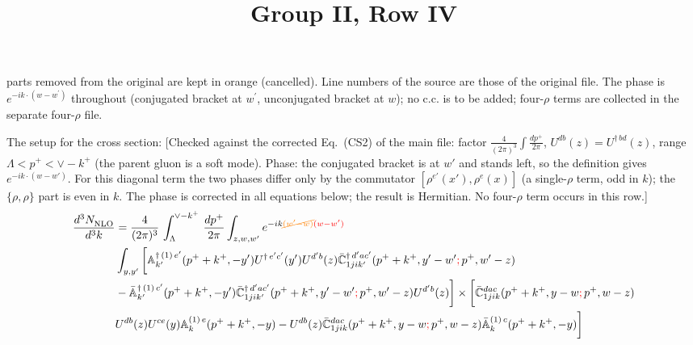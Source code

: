 \documentclass[9pt]{article}
\title{Group II, Row IV}
\author{}
\date{}
\def\mf#1{\mathbb{#1}}
\numberwithin{equation}{section}
\begin{document}
\maketitle {} {\color{orange}parts removed from the original are kept in orange (cancelled).} {\color{red}Line numbers of the source are those of the original file. The phase is $e^{-ik\cdot(w-w^{\prime})}$ throughout (conjugated bracket at $w^{\prime}$, unconjugated bracket at $w$); no c.c. is to be added; four-$\rho$ terms are collected in the separate four-$\rho$ file.}\par
The setup for the cross section: {\color{red}[Checked against the corrected Eq.~(CS2) of the main file: factor $\frac{4}{(2\pi)^{3}}\int\frac{dp^{+}}{2\pi}$, $U^{db}(z)=U^{\dagger\,bd}(z)$, range $\Lambda<p^{+}<\vee-k^{+}$ (the parent gluon is a soft mode). Phase: the conjugated bracket is at $w'$ and stands left, so the definition gives $e^{-ik\cdot(w-w')}$. For this diagonal term the two phases differ only by the commutator $[\rho^{e'}(x'),\rho^{e}(x)]$ (a single-$\rho$ term, odd in $k$); the $\{\rho,\rho\}$ part is even in $k$. The phase is corrected in all equations below; the result is Hermitian. No four-$\rho$ term occurs in this row.]}
\begin{align}
    \frac{d^{3}N_{\rm NLO}^{\rm}}{d^{3}k}  & = \frac{4}{(2\pi)^{3}}\,\int_{\Lambda}^{\vee-k^{+}}\, \frac{dp^{+}}{2\pi}\int_{z,w,w^{\prime}} e^{-ik{\color{orange}\cancel{(w^{\prime}-w)}}{\color{red}(w-w^{\prime})}}\,  \notag \\ & \int_{y,y^{\prime}}\bigg[\mf{A}^{\dagger\, (1)\,e^{\prime}}_{k^{\prime}}(p^{+}+k^{+},-y^{\prime})U^{\dagger\, e^{\prime}c^{\prime}}(y^{\prime})U^{d^{\prime}b}(z) \Bar{\mf{C}}^{\dagger\, d^{\prime}ac^{\prime}}_{1jik^{\prime}}(p^{+}+k^{+},y^{\prime}-w^{\prime}{\color{red};}\, p^{+},w^{\prime}-z) \notag \\ &  -\Bar{\mf{A}}^{\dagger\, (1)\,c^{\prime}}_{k^{\prime}}(p^{+}+k^{+},-y^{\prime}) \Bar{\mf{C}}^{\dagger\, d^{\prime}ac^{\prime}}_{1jik^{\prime}}(p^{+}+k^{+},y^{\prime}-w^{\prime}{\color{red};}\, p^{+},w^{\prime}-z)U^{d^{\prime}b}(z)\bigg]\times\bigg[\Bar{\mf{C}}^{dac}_{1jik}(p^{+}+k^{+},y-w{\color{red};}\, p^{+},w-z)\notag \\ & U^{db}(z)U^{ce}(y) \mf{A}^{(1)\,e}_{k}(p^{+}+k^{+},-y) -U^{db}(z) \Bar{\mf{C}}^{dac}_{1jik}(p^{+}+k^{+},y-w{\color{red};}\, p^{+},w-z)\Bar{\mf{A}}^{(1)\,c}_{k}(p^{+}+k^{+},-y)\bigg]\nonumber
\end{align}
\end{document}

